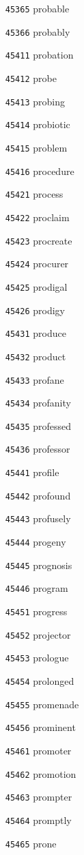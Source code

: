 \documentclass[twoside,11pt]{article}
\begin{document}
\begin{multicols}{5}
\begin{enumerate}
\item[\texttt{45365}] probable
\item[\texttt{45366}] probably
\item[\texttt{45411}] probation
\item[\texttt{45412}] probe
\item[\texttt{45413}] probing
\item[\texttt{45414}] probiotic
\item[\texttt{45415}] problem
\item[\texttt{45416}] procedure
\item[\texttt{45421}] process
\item[\texttt{45422}] proclaim
\item[\texttt{45423}] procreate
\item[\texttt{45424}] procurer
\item[\texttt{45425}] prodigal
\item[\texttt{45426}] prodigy
\item[\texttt{45431}] produce
\item[\texttt{45432}] product
\item[\texttt{45433}] profane
\item[\texttt{45434}] profanity
\item[\texttt{45435}] professed
\item[\texttt{45436}] professor
\item[\texttt{45441}] profile
\item[\texttt{45442}] profound
\item[\texttt{45443}] profusely
\item[\texttt{45444}] progeny
\item[\texttt{45445}] prognosis
\item[\texttt{45446}] program
\item[\texttt{45451}] progress
\item[\texttt{45452}] projector
\item[\texttt{45453}] prologue
\item[\texttt{45454}] prolonged
\item[\texttt{45455}] promenade
\item[\texttt{45456}] prominent
\item[\texttt{45461}] promoter
\item[\texttt{45462}] promotion
\item[\texttt{45463}] prompter
\item[\texttt{45464}] promptly
\item[\texttt{45465}] prone

\end{enumerate}
\end{multicols}
\end{document}

